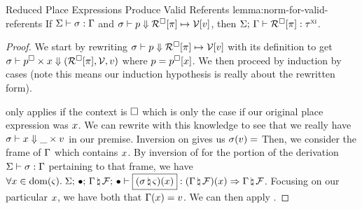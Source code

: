 \begin{oxlemma}{Reduced Place Expressions Produce Valid Referents}
  {lemma:norm-for-valid-referents}
  If $\Sigma \vdash \sigma : \Gamma$
  and $ \sigma \vdash p \Downarrow \mathcal{R}^\square[\pi] \mapsto \mathcal{V} [v] $,
  then
  $\Sigma; \, \Gamma \vdash \mathcal{R}^\square[\pi] : \tau^\textsc{xi}$.
\end{oxlemma}

\begin{proof}
  We start by rewriting 
  $ \sigma \vdash p \Downarrow \mathcal{R}^\square[\pi] \mapsto \mathcal{V} [v] $ with its definition to get
  $ \sigma \vdash p^\square \times x \Downarrow (
    \mathcal{R}^\square[\pi]
  , \mathcal{V}, v) $ where $p = p^\square[x]$. We
  then proceed by induction by cases (note this means our induction hypothesis
  is really about the rewritten form).

  \vspace{1em}
  \noindent \framebox[\textwidth]{
    \figuresize
    \begin{mathpar}
      \PId \and \WFRefId
    \end{mathpar}
  }
  \vspace{1em}

   only applies if the context is $\square$ which is only the
  case if our original place expression was $x$. We can rewrite with this
  knowledge to see that we really have
  $\sigma \vdash x \Downarrow \_ \times v$ in our premise. Inversion on
   gives us $\oxlookup{\oxstore}{\oxvalue}$ Then, we consider the
  frame of $\Gamma$ which contains $x$. By inversion of
   for the portion of the derivation
  $\Sigma \vdash \sigma : \Gamma$ pertaining to that
  frame, we have $\forall \oxid \in \oxdomain{\oxstackframe}. \;
  \oxtypjudge{\oxglobalctx}{\oxemptyctx}{\oxemptyctx}{\oxnewframe{\oxvarctx}{\oxframe}}
  {(\oxnewframe{\oxstore}{\oxstackframe})(\oxid)}{
    (\oxnewframe{\oxvarctx}{\oxframe})(\oxid)
  }{\oxnewframe{\oxvarctx}{\oxframe}}$. Focusing on our particular $x$, we
  have both that $\Gamma(x) = v$. We can then apply
  .

  \vspace{1em}
  \noindent \framebox[\textwidth]{
    \figuresize
    \begin{mathpar}
      \PProj \and \WFRefProj
    \end{mathpar}
  }
  \vspace{1em}


\end{proof}
